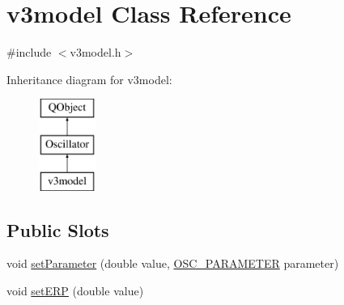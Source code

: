 \hypertarget{classv3model}{\section{v3model Class Reference}
\label{classv3model}
}


{\ttfamily \#include $<$v3model.\+h$>$}

Inheritance diagram for v3model\+:\begin{figure}[H]
\begin{center}
\leavevmode
\includegraphics[height=3.000000cm]{classv3model}
\end{center}
\end{figure}
\subsection*{Public Slots}
\begin{DoxyCompactItemize}
\item 
void \hyperlink{classv3model_a1ce58dd6384772b84a7a3c3f73a70c3f}{set\+Parameter} (double value, \hyperlink{heart_defines_8h_a79395aba577c2bc57e7ca211ff3476a6}{O\+S\+C\+\_\+\+P\+A\+R\+A\+M\+E\+T\+E\+R} parameter)
\item 
void \hyperlink{classv3model_a7b930af4a46f46aaa3301947526c556d}{set\+E\+R\+P} (double value)
\end{DoxyCompactItemize}
